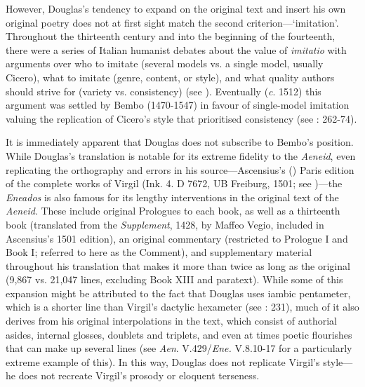 \documentclass{dhbenelux}
\begin{document}
However, Douglas's tendency to expand on the original text and insert
his own original poetry does not at first sight match the second
criterion---`imitation'. Throughout the thirteenth century and into the
beginning of the fourteenth, there were a series of Italian humanist
debates about the value of \emph{imitatio} with arguments over who to
imitate (several models vs. a single model, usually Cicero), what to
imitate (genre, content, or style), and what quality authors should
strive for (variety vs. consistency) (see \citeauthor{mclaughlin1996} 
\citeyear{mclaughlin1996}). Eventually (\emph{c}. 1512) this argument 
was settled by Bembo (1470-1547) in favour of single-model imitation 
valuing the replication of Cicero's style that prioritised consistency 
(see \citeauthor{mclaughlin1996} \citeyear{mclaughlin1996}: 262-74).

It is immediately apparent that Douglas does not subscribe to Bembo's
position. While Douglas's translation is notable for its extreme
fidelity to the \emph{Aeneid}, even replicating the orthography and
errors in his source---Ascensius's (\citeyear{virgil1501}) Paris 
edition of the complete works of Virgil (Ink. 4. D 7672, UB Freiburg, 
1501; see \citeauthor{bawcutt1973} \citeyear{bawcutt1973})---the 
\emph{Eneados} is also famous for its lengthy interventions in the 
original text of the \emph{Aeneid}. These include original Prologues 
to each book, as well as a thirteenth book (translated from the 
\emph{Supplement}, 1428, by Maffeo Vegio, included in Ascensius's 1501 edition), an original commentary 
(restricted to Prologue I and Book I; referred to here as the Comment),
and supplementary material throughout his translation that makes it more than twice as long
as the original (9,867 vs. 21,047 lines, excluding Book XIII and paratext). While some of this expansion
might be attributed to the fact that Douglas uses iambic pentameter,
which is a shorter line than Virgil's dactylic hexameter (see 
\citeauthor{macafee2013} \citeyear{macafee2013}: 231), much of it also 
derives from his original interpolations in the text, which consist of 
authorial asides, internal glosses, doublets and triplets, and even at 
times poetic flourishes that can make up several lines (see 
\emph{Aen}. V.429/\emph{Ene.} V.8.10-17 for a particularly extreme 
example of this). In this way, Douglas does not replicate Virgil's 
style---he does not recreate Virgil's prosody or eloquent terseness.
\end{document}
